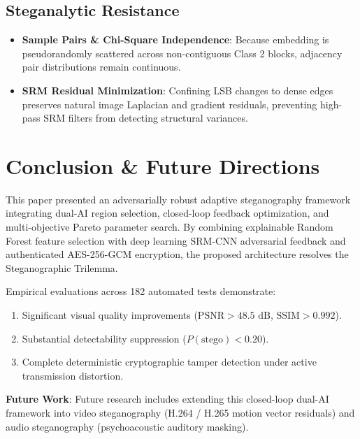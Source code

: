 \documentclass[conference]{IEEEtran}
\begin{document}
\subsection{Steganalytic Resistance}
\begin{itemize}
    \item \textbf{Sample Pairs \& Chi-Square Independence}: Because embedding is pseudorandomly scattered across non-contiguous Class 2 blocks, adjacency pair distributions remain continuous.
    \item \textbf{SRM Residual Minimization}: Confining LSB changes to dense edges preserves natural image Laplacian and gradient residuals, preventing high-pass SRM filters from detecting structural variances.
\end{itemize}

\section{Conclusion \& Future Directions}
This paper presented an adversarially robust adaptive steganography framework integrating dual-AI region selection, closed-loop feedback optimization, and multi-objective Pareto parameter search. By combining explainable Random Forest feature selection with deep learning SRM-CNN adversarial feedback and authenticated AES-256-GCM encryption, the proposed architecture resolves the Steganographic Trilemma.

Empirical evaluations across 182 automated tests demonstrate:
\begin{enumerate}
    \item Significant visual quality improvements ($\text{PSNR} > 48.5\text{ dB}$, $\text{SSIM} > 0.992$).
    \item Substantial detectability suppression ($P(\text{stego}) < 0.20$).
    \item Complete deterministic cryptographic tamper detection under active transmission distortion.
\end{enumerate}

\textbf{Future Work}: Future research includes extending this closed-loop dual-AI framework into video steganography (H.264 / H.265 motion vector residuals) and audio steganography (psychoacoustic auditory masking).



\end{document}
